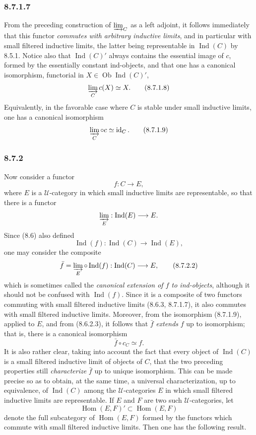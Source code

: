 \documentclass[11pt]{article}
\newcommand{\U}{\mathcal{U}}
\newcommand{\Ob}{\operatorname{Ob}}
\newcommand{\Ind}{\operatorname{Ind}}
\newcommand{\id}{\operatorname{id}}
\newcommand{\Hhom}{\operatorname{Hom}}
\begin{document}
\subsubsection*{8.7.1.7}
From the preceding construction of $\varinjlim_C$ as a left adjoint, it follows immediately that this functor \emph{commutes with arbitrary inductive limits}, and in particular with small filtered inductive limits, the latter being representable in $\Ind(C)$ by 8.5.1. Notice also that $\Ind(C)'$ always contains the essential image of $c$, formed by the essentially constant ind-objects, and that one has a canonical isomorphism, functorial in $X\in\Ob\Ind(C)'$,
\[
\varinjlim_C c(X)\simeq X.
\tag{8.7.1.8}
\]
Equivalently, in the favorable case where $C$ is stable under small inductive limits, one has a canonical isomorphism
\[
\varinjlim_C\circ c\simeq \id_C.
\tag{8.7.1.9}
\]

\subsubsection*{8.7.2}
Now consider a functor
\[
 f:C\longrightarrow E,
\tag{8.7.2.1}
\]
where $E$ is a $\U$-category in which small inductive limits are representable, so that there is a functor
\[
\varinjlim_E:\Ind(E)\longrightarrow E.
\]
Since (8.6) also defined
\[
\Ind(f):\Ind(C)\longrightarrow \Ind(E),
\]
one may consider the composite
\[
 \bar f=\varinjlim_E\circ\Ind(f):\Ind(C)\longrightarrow E,
\tag{8.7.2.2}
\]
which is sometimes called the \emph{canonical extension of $f$ to ind-objects}, although it should not be confused with $\Ind(f)$. Since it is a composite of two functors commuting with small filtered inductive limits (8.6.3, 8.7.1.7), it also commutes with small filtered inductive limits. Moreover, from the isomorphism (8.7.1.9), applied to $E$, and from (8.6.2.3), it follows that $\bar f$ \emph{extends} $f$ up to isomorphism; that is, there is a canonical isomorphism
\[
 \bar f\circ c_C\simeq f.
\tag{8.7.2.3}
\]
It is also rather clear, taking into account the fact that every object of $\Ind(C)$ is a small filtered inductive limit of objects of $C$, that the two preceding properties still \emph{characterize} $\bar f$ up to unique isomorphism. This can be made precise so as to obtain, at the same time, a universal characterization, up to equivalence, of $\Ind(C)$ among the $\U$-categories $E$ in which small filtered inductive limits are representable. If $E$ and $F$ are two such $\U$-categories, let
\[
\Hhom(E,F)'\subset \Hhom(E,F)
\tag{8.7.2.4}
\]
denote the full subcategory of $\Hhom(E,F)$ formed by the functors which commute with small filtered inductive limits. Then one has the following result.
\end{document}
